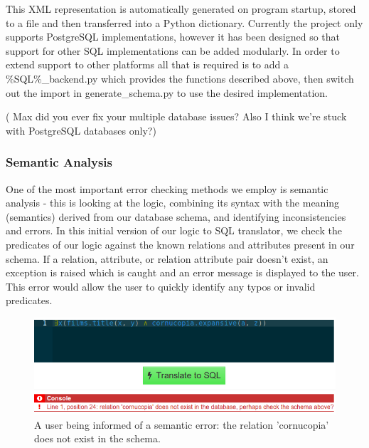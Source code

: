\documentclass[a4paper, 11pt]{article}
\begin{document}
      This XML representation is automatically generated on program startup,
      stored to a file and then transferred into a Python dictionary.
      Currently the project only supports PostgreSQL implementations, however it
      has been designed so that support for other SQL implementations can be
      added modularly. In order to extend support to other platforms all that is
      required is to add a \%SQL\%\_backend.py which provides the functions
      described above, then switch out the import in generate\_schema.py to use
      the desired implementation.


      ( Max did you ever fix your multiple database issues? Also I
      think we're stuck with PostgreSQL databases only?)

    \subsubsection{Semantic Analysis}
      One of the most important error checking methods we employ is semantic
      analysis - this is looking at the logic, combining its syntax with the
      meaning (semantics) derived from our database schema, and identifying
      inconsistencies and errors. In this initial version of our logic to SQL
      translator, we check the predicates of our logic against the known
      relations and attributes present in our schema. If a relation, attribute,
      or relation attribute pair doesn't exist, an exception is raised which is
      caught and an error message is displayed to the user. This error would
      allow the user to quickly identify any typos or invalid predicates.

      \begin{figure}[h!]
        \centering
        \includegraphics[width=1.0\textwidth]{images/error.png}
        \caption{A user being informed of a semantic error: the relation
          'cornucopia' does not exist in the schema.}
      \end{figure}
\end{document}
